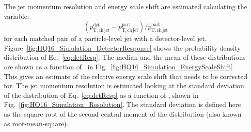 The jet momentum resolution and energy scale shift are estimated calculating the variable:
\begin{equation}
(p_{\mathrm{T,ch\, jet}}^{\mathrm{det}} - p_{\mathrm{T,ch\, jet}}^{\mathrm{part}}) / p_{\mathrm{T,ch\, jet}}^{\mathrm{part}}
\label{eq:detResp}
\end{equation}
for each matched pair of a particle-level jet with a detector-level jet.
Figure~\ref{fig:HQ16_Simulation_DetectorResponse} shows the probability density distribution of Eq.~\ref{eq:detResp}.
The median and the mean of these distributions are shown as a function of \ptchjetgen\ in Fig.~\ref{fig:HQ16_Simulation_EnergyScaleShift}.
This gives an estimate of the relative energy scale shift that needs to be corrected for.
The jet momentum resolution is estimated looking at the standard deviation of the distribution of Eq.~\ref{eq:detResp} as a function
of \ptchjetgen, shown in Fig.~\ref{fig:HQ16_Simulation_Resolution}. The standard deviation is defined here as 
the square root of the second central moment of the distribution (also known as root-mean-square).

